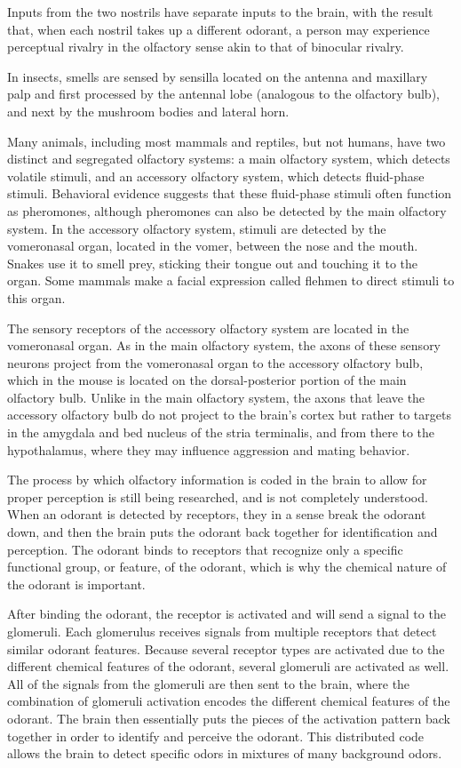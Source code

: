 Inputs from the two nostrils have separate inputs to the brain, with the result that, when each nostril takes up a different odorant, a person may experience perceptual rivalry in the olfactory sense akin to that of binocular rivalry.

In insects, smells are sensed by sensilla located on the antenna and maxillary palp and first processed by the antennal lobe (analogous to the olfactory bulb), and next by the mushroom bodies and lateral horn.

Many animals, including most mammals and reptiles, but not humans, have two distinct and segregated olfactory systems: a main olfactory system, which detects volatile stimuli, and an accessory olfactory system, which detects fluid-phase stimuli. Behavioral evidence suggests that these fluid-phase stimuli often function as pheromones, although pheromones can also be detected by the main olfactory system. In the accessory olfactory system, stimuli are detected by the vomeronasal organ, located in the vomer, between the nose and the mouth. Snakes use it to smell prey, sticking their tongue out and touching it to the organ. Some mammals make a facial expression called flehmen to direct stimuli to this organ.

The sensory receptors of the accessory olfactory system are located in the vomeronasal organ. As in the main olfactory system, the axons of these sensory neurons project from the vomeronasal organ to the accessory olfactory bulb, which in the mouse is located on the dorsal-posterior portion of the main olfactory bulb. Unlike in the main olfactory system, the axons that leave the accessory olfactory bulb do not project to the brain's cortex but rather to targets in the amygdala and bed nucleus of the stria terminalis, and from there to the hypothalamus, where they may influence aggression and mating behavior.

The process by which olfactory information is coded in the brain to allow for proper perception is still being researched, and is not completely understood. When an odorant is detected by receptors, they in a sense break the odorant down, and then the brain puts the odorant back together for identification and perception. The odorant binds to receptors that recognize only a specific functional group, or feature, of the odorant, which is why the chemical nature of the odorant is important.

After binding the odorant, the receptor is activated and will send a signal to the glomeruli. Each glomerulus receives signals from multiple receptors that detect similar odorant features. Because several receptor types are activated due to the different chemical features of the odorant, several glomeruli are activated as well. All of the signals from the glomeruli are then sent to the brain, where the combination of glomeruli activation encodes the different chemical features of the odorant. The brain then essentially puts the pieces of the activation pattern back together in order to identify and perceive the odorant. This distributed code allows the brain to detect specific odors in mixtures of many background odors.

